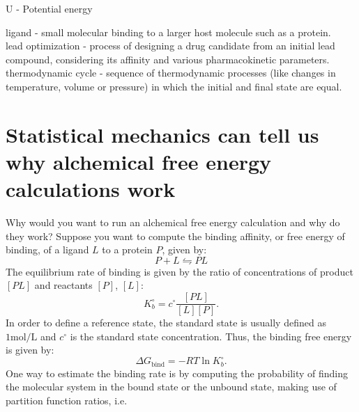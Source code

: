 \documentclass[9pt,bestpractices]{livecoms}
\begin{document}
\begin{tcolorbox}[title=List of Symbols, colback=green!10!white]
U - Potential energy\\
\end{tcolorbox}
\begin{tcolorbox}[title=Common terminology, colback=green!10!white]
    ligand - small molecular binding to a larger host molecule such as a protein.\\ 
    lead optimization - process of designing a drug candidate from an initial lead compound, considering its affinity and various pharmacokinetic parameters.\\
    thermodynamic cycle - sequence of thermodynamic processes (like changes in temperature, volume or pressure) in which the initial and final state are equal.\\
\end{tcolorbox}
%
\section{Statistical mechanics can tell us why alchemical free energy calculations work}
\label{sec:theory}
Why would you want to run an alchemical free energy calculation and why do they work? Suppose you want to compute the binding affinity, or free energy of binding, of a ligand $L$ to a protein $P$, given by:
\begin{equation}
P+L\leftrightharpoons PL
\end{equation}
The equilibrium rate of binding is given by the ratio of concentrations of product $[PL]$ and reactants $[P]$, $[L]$:
\begin{equation}
 K_b^{\circ} = c^{\circ}\frac{[PL]}{[L][P]}.
\end{equation}
In order to define a reference state, the standard state is usually defined as $1 \mathrm{mol}/\mathrm{L}$ and $c^\circ$ is the standard state concentration. Thus, the binding free energy is given by:
\begin{equation}
    \Delta G_{\mathrm{bind}} = -RT\ln K_b^{\circ}.
\end{equation}
One way to estimate the binding rate is by computing the probability of finding the molecular system in the bound state or the unbound state, making use of partition function ratios, i.e. 
\end{document}
